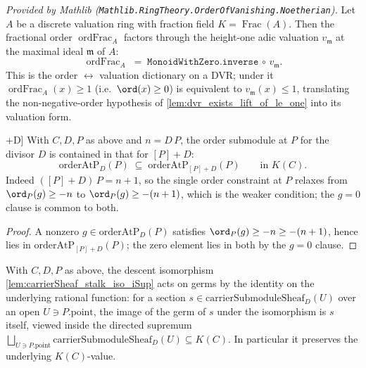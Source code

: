 \begin{lemma}
  \label{lem:ordFrac_eq_inverse_valuation}
  \mathlibok
  \textit{Provided by Mathlib
  (\texttt{Mathlib.RingTheory.OrderOfVanishing.Noetherian}).}
  Let \(A\) be a discrete valuation ring with fraction field
  \(K = \operatorname{Frac}(A)\). Then the fractional order
  \(\operatorname{ordFrac}_A\) factors through the height-one adic valuation
  \(v_{\mathfrak m}\) at the maximal ideal \(\mathfrak m\) of \(A\):
  \[
    \operatorname{ordFrac}_A \;=\;
    \texttt{MonoidWithZero.inverse} \,\circ\, v_{\mathfrak m}.
  \]
  This is the order \(\leftrightarrow\) valuation dictionary on a DVR; under it
  \(\operatorname{ordFrac}_A(x) \ge 1\) (i.e.\ \(\ord(x) \ge 0\)) is equivalent
  to \(v_{\mathfrak m}(x) \le 1\), translating the non-negative-order hypothesis
  of \cref{lem:dvr_exists_lift_of_le_one} into its valuation form.
\end{lemma}

\begin{lemma}\leanok
[Order submodule is monotone under \(D \rightsquigarrow [P]+D\)]
  \label{lem:orderAtPSubmodule_le_single_add}
  With \(C, D, P\) as above and \(n = D\,P\), the order submodule at \(P\) for
  the divisor \(D\) is contained in that for \([P]+D\):
  \[
    \mathrm{orderAtP}_D(P) \;\subseteq\; \mathrm{orderAtP}_{[P]+D}(P)
    \qquad\text{in } K(C).
  \]
  Indeed \(([P]+D)\,P = n+1\), so the single order constraint at \(P\) relaxes
  from \(\ord_P(g) \ge -n\) to \(\ord_P(g) \ge -(n+1)\), which is the weaker
  condition; the \(g = 0\) clause is common to both.
\end{lemma}

\begin{proof}
  \leanok
  A nonzero \(g \in \mathrm{orderAtP}_D(P)\) satisfies \(\ord_P(g) \ge -n \ge
  -(n+1)\), hence lies in \(\mathrm{orderAtP}_{[P]+D}(P)\); the zero element lies
  in both by the \(g = 0\) clause.
\end{proof}

\begin{lemma}
  \label{lem:carrierSheaf_stalk_iso_iSup_germ_coe}
  With \(C, D, P\) as above, the descent isomorphism
  \cref{lem:carrierSheaf_stalk_iso_iSup} acts on germs by the identity on the
  underlying rational function: for a section
  \(s \in \mathrm{carrierSubmoduleSheaf}_D(U)\) over an open
  \(U \ni P.\mathrm{point}\), the image of the germ of \(s\) under the
  isomorphism is \(s\) itself, viewed inside the directed supremum
  \(\bigsqcup_{U \ni P.\mathrm{point}} \mathrm{carrierSubmoduleSheaf}_D(U)
  \subseteq K(C)\). In particular it preserves the underlying \(K(C)\)-value.
\end{lemma}

